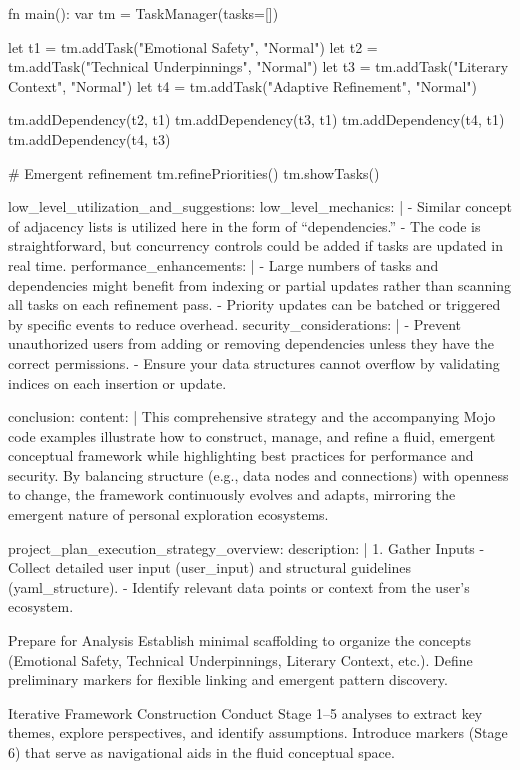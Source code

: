     fn main():
        var tm = TaskManager(tasks=[])

        let t1 = tm.addTask("Emotional Safety", "Normal")
        let t2 = tm.addTask("Technical Underpinnings", "Normal")
        let t3 = tm.addTask("Literary Context", "Normal")
        let t4 = tm.addTask("Adaptive Refinement", "Normal")

        tm.addDependency(t2, t1)
        tm.addDependency(t3, t1)
        tm.addDependency(t4, t1)
        tm.addDependency(t4, t3)

        # Emergent refinement
        tm.refinePriorities()
        tm.showTasks()

  low_level_utilization_and_suggestions:
    low_level_mechanics: |
      - Similar concept of adjacency lists is utilized here in the form of “dependencies.”
      - The code is straightforward, but concurrency controls could be added if tasks are updated in real time.
    performance_enhancements: |
      - Large numbers of tasks and dependencies might benefit from indexing or partial updates rather than scanning all tasks on each refinement pass.
      - Priority updates can be batched or triggered by specific events to reduce overhead.
    security_considerations: |
      - Prevent unauthorized users from adding or removing dependencies unless they have the correct permissions.
      - Ensure your data structures cannot overflow by validating indices on each insertion or update.

conclusion:
  content: |
    This comprehensive strategy and the accompanying Mojo code examples illustrate how to construct, manage, and refine a fluid, emergent conceptual framework while highlighting best practices for performance and security. By balancing structure (e.g., data nodes and connections) with openness to change, the framework continuously evolves and adapts, mirroring the emergent nature of personal exploration ecosystems.

project_plan_execution_strategy_overview:
  description: |
    1. Gather Inputs
       - Collect detailed user input ({{user_input}}) and structural guidelines ({{yaml_structure}}).
       - Identify relevant data points or context from the user’s ecosystem.

Prepare for Analysis
Establish minimal scaffolding to organize the concepts (Emotional Safety, Technical Underpinnings, Literary Context, etc.).
Define preliminary markers for flexible linking and emergent pattern discovery.

Iterative Framework Construction
Conduct Stage 1–5 analyses to extract key themes, explore perspectives, and identify assumptions.
Introduce markers (Stage 6) that serve as navigational aids in the fluid conceptual space.

